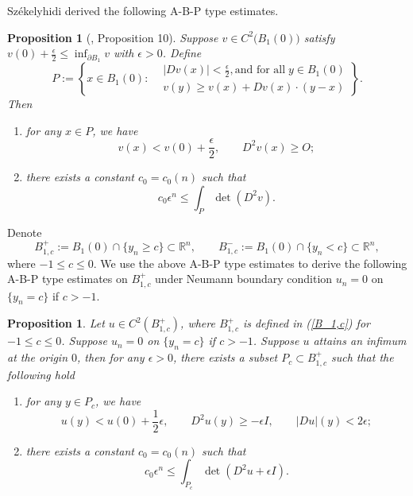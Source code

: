 \documentclass[12pt]{amsart}
\newtheorem{proposition}[theorem]{Proposition}
\theoremstyle{definition}
\theoremstyle{remark}
\numberwithin{equation}{section}
\begin{document}
Sz\'ekelyhidi \cite{Sze15} derived the following A-B-P type estimates.
\begin{proposition}[\cite{Sze15}, Proposition 10]\label{ABP_max}
	Suppose $v \in C^2 \big(B_1(0)\big)$ satisfy $v(0) + \frac{\epsilon}{2} \leq \inf_{\partial B_1} v$ with $\epsilon > 0$. Define
	\begin{equation}\label{P_set}
	P := \left\{ x\in B_1(0) : 
	\begin{aligned}
	& |D v(x)| < \frac{\epsilon}{2}, \text{and for all} \; y \in B_1(0)\\
	& v(y) \geq v(x) + Dv(x) \cdot (y - x)
	\end{aligned}
	\right\}.
	\end{equation}
	Then
	\begin{enumerate}
		\item for any $x\in P$, we have
		\begin{equation}
		v(x) < v(0) + \frac{\epsilon}{2}, \qquad D^2 v(x) \geq O;
		\end{equation}
		\item there exists a constant $c_0 = c_0(n)$ such that
		\begin{equation}
		c_0 \epsilon^n \leq \int_{P} \det (D^2 v).
		\end{equation}
	\end{enumerate}
\end{proposition}

Denote
\begin{equation}\label{B_1,c}
B_{1, c}^+ := B_1(0) \cap \{ y_n \geq c \} \subset \mathbb{R}^n, \qquad B_{1, c}^- := B_1(0) \cap \{ y_n < c \} \subset \mathbb{R}^n,
\end{equation}
where $-1 \leq c \leq 0$.
We use the above A-B-P type estimates to derive the following A-B-P type estimates on $B_{1,c}^+$ under Neumann boundary condition $u_n = 0$ on $\{ y_n = c\}$ if $c > -1$.


\begin{proposition}\label{B_c,1_prop}
	Let $u \in C^2 (B_{1,c}^+)$, where $B_{1,c}^+$ is defined in (\ref{B_1,c}) for $-1 \leq c \leq 0$. Suppose $u_n = 0$ on $\{ y_n = c\}$ if $c > -1$. Suppose $u$ attains an infimum at the origin $0$, then for any $\epsilon > 0$, there exists a subset $P_c \subset B_{1,c}^+$ such that the following hold
	\begin{enumerate}
		\item for any $y \in P_c$, we have
		\begin{equation}\label{B_c,1_ineq_1}
		u(y) < u(0) + \frac{1}{2}\epsilon, \qquad D^2 u(y) \geq - \epsilon I, \qquad |Du|(y) < 2\epsilon;
		\end{equation} 
		\item there exists a constant $c_0 = c_0(n)$ such that
		\begin{equation}
		c_0 \epsilon^n \leq \int_{P_c} \det (D^2 u + \epsilon I).
		\end{equation}
	\end{enumerate}
\end{proposition}
\end{document}
